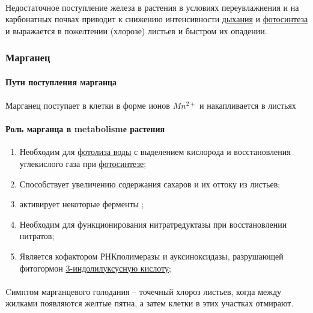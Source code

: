 \paragraph*{}Недостаточное поступление железа в растения в условиях переувлажнения и на карбонатных почвах приводит к снижению интенсивности \hyperlink{sect_breazing}{дыхания} и \hyperlink{photosyntesis}{фотосинтеза} и выражается в пожелтении (хлорозе) листьев и быстром их опадении.

\subsubsection*{Марганец}

\paragraph*{Пути поступления марганца}

\paragraph*{}Марганец поступает в клетки в форме ионов $Mn^{2+}$ и накапливается в листьях 

\paragraph*{Роль марганца в \gls{metabolism}е растения}

\begin{enumerate}
	\item Необходим для \hyperlink{photolisys}{фотолиза воды} с выделением кислорода и восстановления углекислого газа при \hyperlink{photosyntesis}{фотосинтезе};
	\item Способствует увеличению содержания сахаров и их оттоку из листьев;
	\item активирует некоторые ферменты ;
	\item Необходим для функционирования нитратредуктазы при восстановлении нитратов;
	\item Является кофактором РНКполимеразы и ауксиноксидазы, разрушающей фитогормон \hyperlink{auxsin}{3-индолилуксусную кислоту};
\end{enumerate}

\paragraph*{}Cимптом марганцевого голодания -- точечный хлороз листьев, когда между жилками появляются желтые пятна, а затем клетки в этих участках отмирают. 

